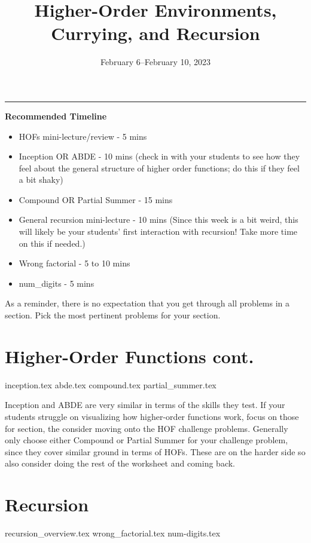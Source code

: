 \documentclass{exam}
\title{Higher-Order Environments, Currying, and Recursion}
\date{February 6--February 10, 2023}
\begin{document}
\maketitle
\rule{\textwidth}{0.15em}
\fontsize{12}{15}\selectfont

\begin{meta}
\textbf{Recommended Timeline}
\begin{itemize}
    \item HOFs mini-lecture/review - 5 mins
    \item Inception OR ABDE - 10 mins (check in with your students to see how they feel about the general structure of higher order functions; do this if they feel a bit shaky)
    \item Compound OR Partial Summer - 15 mins
    \item General recursion mini-lecture - 10 mins (Since this week is a bit weird, this will likely be your students' first interaction with recursion! Take more time on this if needed.)
    \item Wrong factorial - 5 to 10 mins
    \item num\_digits - 5 mins
\end{itemize}
As a reminder, there is no expectation that you get through all problems in a section. Pick the most pertinent problems for your section. 
\end{meta}

\begin{questions}
    \section{Higher-Order Functions cont.}
    {inception.tex}
    {abde.tex}
    {compound.tex}
    {partial_summer.tex}
    \begin{questionmeta}
        Inception and ABDE are very similar in terms of the skills they test. If your students struggle on visualizing how higher-order functions work, focus on those for section, the consider moving onto the HOF challenge problems.
        Generally only choose either Compound or Partial Summer for your challenge problem, since they cover similar ground in terms of HOFs. These are on the harder side so also consider doing the rest of the worksheet and coming back.
    \end{questionmeta}

    \section{Recursion}
    {recursion_overview.tex}
    {wrong_factorial.tex}
    {num-digits.tex}
\end{questions}
\end{document}
